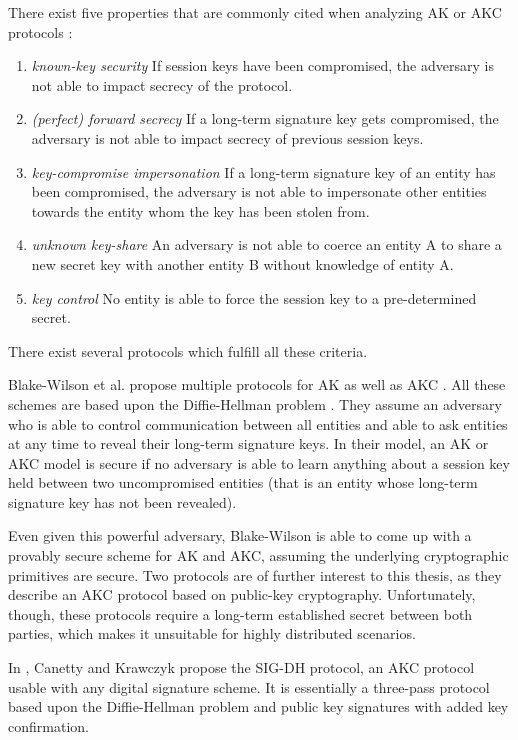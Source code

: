 There exist five properties that are commonly cited when analyzing AK or AKC protocols \cite{menezes1996handbook,blake1997key,law2003efficient}:
\begin{enumerate}
    \item \emph{known-key security}
        If session keys have been compromised, the adversary is not able to impact secrecy of the protocol.
    \item \emph{(perfect) forward secrecy}
        If a long-term signature key gets compromised, the adversary is not able to impact secrecy of previous session keys.
    \item \emph{key-compromise impersonation}
        If a long-term signature key of an entity has been compromised, the adversary is not able to impersonate other entities towards the entity whom the key has been stolen from.
    \item \emph{unknown key-share}
        An adversary is not able to coerce an entity A to share a new secret key with another entity B without knowledge of entity A.
    \item \emph{key control}
        No entity is able to force the session key to a pre-determined secret.
\end{enumerate}
There exist several protocols which fulfill all these criteria.

Blake-Wilson et al. propose multiple protocols for AK as well as AKC \cite{blake1997key}.
All these schemes are based upon the Diffie-Hellman problem \cite{diffie1976new}.
They assume an adversary who is able to control communication between all entities and able to ask entities at any time to reveal their long-term signature keys.
In their model, an AK or AKC model is secure if no adversary is able to learn anything about a session key held between two uncompromised entities (that is an entity whose long-term signature key has not been revealed).

Even given this powerful adversary, Blake-Wilson is able to come up with a provably secure scheme for AK and AKC, assuming the underlying cryptographic primitives are secure.
Two protocols are of further interest to this thesis, as they describe an AKC protocol based on public-key cryptography.
Unfortunately, though, these protocols require a long-term established secret between both parties, which makes it unsuitable for highly distributed scenarios.

In \cite{canetti2001analysis}, Canetty and Krawczyk propose the SIG-DH protocol, an AKC protocol usable with any digital signature scheme.
It is essentially a three-pass protocol based upon the Diffie-Hellman problem and public key signatures with added key confirmation.

